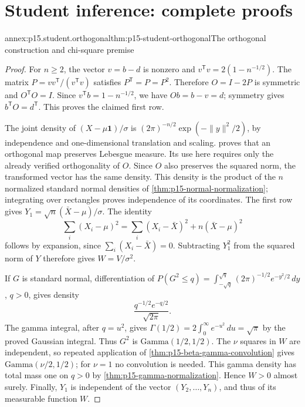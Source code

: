 \section{Student inference: complete proofs}
\label{sec:annex-p15-student-inference}

\begin{annexitem}{annex:p15.student.orthogonal}{thm:p15-student-orthogonal}{The orthogonal construction and chi-square premise}
\begin{proof}
For \(n\geq2\), the vector \(v=b-d\) is nonzero and
\(v^{\mathsf T}v=2(1-n^{-1/2})\).
The matrix \(P=vv^{\mathsf T}/(v^{\mathsf T}v)\) satisfies
\(P^{\mathsf T}=P=P^2\). Therefore \(O=I-2P\) is symmetric
and \(O^{\mathsf T}O=I\). Since
\(v^{\mathsf T}b=1-n^{-1/2}\), we have
\(Ob=b-v=d\); symmetry gives \(b^{\mathsf T}O=d^{\mathsf T}\).
This proves the claimed first row.

The joint density of \((X-\mu\mathbf1)/\sigma\) is
\((2\pi)^{-n/2}\exp(-\|y\|^2/2)\), by independence and
one-dimensional translation and scaling.
 proves that an orthogonal
map preserves Lebesgue measure. Its use here requires only
the already verified orthogonality of \(O\).
Since \(O\) also preserves the squared norm, the transformed
vector has the same density. This density is the product of
the \(n\) normalized standard normal densities
of \cref{thm:p15-normal-normalization}; integrating over
rectangles proves independence of its coordinates.
The first row gives
\(Y_1=\sqrt n(\bar X-\mu)/\sigma\). The identity
\[
 \sum_i(X_i-\mu)^2
       =\sum_i(X_i-\bar X)^2+n(\bar X-\mu)^2
\]
follows by expansion, since \(\sum_i(X_i-\bar X)=0\).
Subtracting \(Y_1^2\) from the squared norm of \(Y\)
therefore gives \(W=V/\sigma^2\).

If \(G\) is standard normal, differentiation of
\(P(G^2\leq q)=\int_{-\sqrt q}^{\sqrt q}
 (2\pi)^{-1/2}e^{-y^2/2}\,dy\), \(q>0\), gives density
\[
                       \frac{q^{-1/2}e^{-q/2}}{\sqrt{2\pi}}.
\]
The gamma integral, after \(q=u^2\), gives
\(\Gamma(1/2)=2\int_0^\infty e^{-u^2}\,du=\sqrt\pi\)
by the proved Gaussian integral.
Thus \(G^2\) is \(\mathrm{Gamma}(1/2,1/2)\).
The \(\nu\) squares in \(W\) are independent, so repeated
application of \cref{thm:p15-beta-gamma-convolution}
gives \(\mathrm{Gamma}(\nu/2,1/2)\); for \(\nu=1\)
no convolution is needed.
This gamma density has total mass one on \(q>0\)
by \cref{thm:p15-gamma-normalization}. Hence \(W>0\)
almost surely. Finally, \(Y_1\) is independent of the
vector \((Y_2,\ldots,Y_n)\), and thus of its measurable
function \(W\).
\end{proof}
\end{annexitem}

